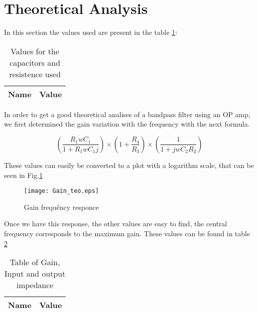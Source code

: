 \section{Theoretical Analysis}
\label{sec:analysis}

In this section the values used are present in the table \ref{tab:values}:

\begin{table}[h]
  \centering
  \begin{tabular}{|l|r|}
    \hline    
    {\bf Name} & {\bf Value} \\ \hline
    
  \end{tabular}
  \caption{Values for the capacitors and resistence used}
  \label{tab:values}
\end{table}



In order to get a good theoretical analises of a bandpass filter using an OP amp, we first determined the gain variation with the frequency with the next formula.



\begin{equation}
    \left ( \frac{R_1wC_1}{1+R_1wC_1j} \right )\times\left ( 1+\frac{R_4}{R_3} \right )\times\left ( \frac{1}{1+jwC_2R_2} \right )
\end{equation}

These values can easily be converted to a plot with a logarithm scale, that can be seen in Fig.\ref{fig:gain}

\begin{figure}[!ht] 
\centering
\texttt{[image: Gain\_teo.eps]}
\caption{Gain frequêncy responce}
\label{fig:gain}
\end{figure}

Once we have this response, the other values are easy to find, the central frequency corresponds to the maximum gain.
These values can be found in table \ref{tab:values_meio}



\begin{table}[h]
  \centering
  \begin{tabular}{|l|r|}
    \hline    
    {\bf Name} & {\bf Value} \\ \hline
    
  \end{tabular}
  \caption{Table of Gain, Input and output impedance}
  \label{tab:values_meio}
\end{table}



